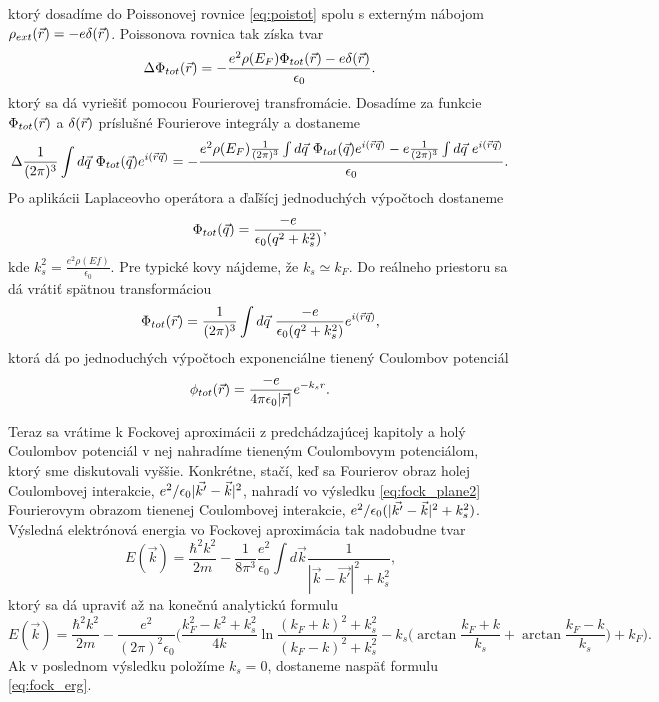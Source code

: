 ktorý dosadíme do Poissonovej rovnice \eqref{eq:poistot}  spolu s externým nábojom $\rho_{ext}(\vec{r})=-e\delta(\vec{r})$. Poissonova rovnica tak získa tvar
 \begin{equation}
  \label{eq:poistot_final}
   \Delta \Phi_{tot}(\vec{r})=-\frac{e^2\rho(E_F)\Phi_{tot}(\vec{r})-e\delta(\vec{r})}{\epsilon_0} \text{.}
 \end{equation}
 ktorý sa dá vyriešiť pomocou Fourierovej transfromácie. Dosadíme za funkcie $\Phi_{tot}(\vec{r})$ a $\delta(\vec{r})$ príslušné Fourierove integrály a dostaneme  
 \begin{equation}
  \Delta \frac{1}{(2\pi)^3}\int d\vec{q}\ \Phi_{tot}(\vec{q}) e^{i(\vec{r}\vec{q})}=-\frac{e^2 \rho(E_F) \frac{1}{(2\pi)^3}\int d\vec{q}\  \Phi_{tot}(\vec{q}) e^{i(\vec{r}\vec{q})}-e\frac{1}{(2\pi)^3}\int d\vec{q}\  e^{i(\vec{r}\vec{q})}}{\epsilon_0} 
    \text{.}
 \end{equation}
 Po aplikácii Laplaceovho operátora a ďaľšícj jednoduchých výpočtoch dostaneme
 \begin{equation}
  \label{eq:screenpot_FT}
  \Phi_{tot}(\vec{q})=\frac{-e}{\epsilon_0(q^2+k_s^2)}\text{,}
 \end{equation}
kde $k_s^2=\frac{e^2 \rho(Ef)}{\epsilon_0}$. Pre typické kovy nájdeme, že $k_s \simeq k_F$.
Do reálneho priestoru sa dá vrátiť spätnou transformáciou
 \begin{equation}
 \Phi_{tot}(\vec{r})=\frac{1}{(2\pi)^3}\int d\vec{q}\ \frac{-e}{\epsilon_0(q^2+k_s^2)} e^{i(\vec{r}\vec{q})} \text{,}
 \end{equation}
ktorá dá po jednoduchých výpočtoch exponenciálne tienený Coulombov potenciál
 \begin{equation}
  \label{eq:yukav_pot}
  \phi_{tot}(\vec{r})=\frac{-e}{4\pi\epsilon_0 |\vec{r}| }e^{-k_s r} \text{.}
 \end{equation}
 
 Teraz sa vrátime k Fockovej aproximácii z predchádzajúcej kapitoly a holý Coulombov potenciál v nej nahradíme tieneným Coulombovym potenciálom, ktorý sme diskutovali vyššie. Konkrétne, stačí, keď sa Fourierov obraz holej Coulombovej interakcie, $e^2/\epsilon_0|\vec{k'}-\vec{k}|^2$, nahradí vo výsledku \eqref{eq:fock_plane2}
 Fourierovym obrazom tienenej Coulombovej interakcie, $e^2/\epsilon_0(|\vec{k'}-\vec{k}|^2+k_s^2)$.
Výsledná elektrónová energia vo Fockovej aproximácia tak nadobudne tvar
 \begin{equation}
  \label{eq:fock_screen}
  E(\vec{k})=\frac{\hbar^2 k^2}{2m} - \frac{1}{8\pi^3}  \frac{e^2}{\epsilon_0}  \int d\vec{k} \frac{1}{|\vec{k}-\vec{k'}|^2+k_s^2} \text{,}
 \end{equation}
 ktorý sa dá upraviť až na konečnú analytickú formulu
 \begin{equation}
  \label{eq:fock_screen_final}
  E(\vec{k})=\frac{\hbar^2 k^2} {2m} - \frac{e^2}{(2\pi)^2\epsilon_0} \biggl(
    \frac{k_F^2-k^2+k_s^2}{4k} \ln{\frac{(k_F+k)^2+k_s^2}{(k_F-k)^2+k_s^2}}-k_s\bigl(\arctan{\frac{k_F+k}{k_s}}+\arctan{\frac{k_F-k}{k_s}}\bigr)+k_F\biggr) \text{.}
 \end{equation}
 Ak v poslednom výsledku položíme $k_s = 0$, dostaneme naspäť formulu \eqref{eq:fock_erg}. 
 

